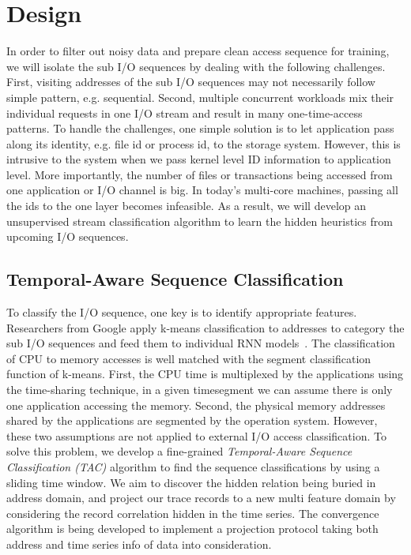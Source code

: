 \section{Design}

In order to filter out noisy data and prepare clean access sequence for training,
we will isolate the sub I/O sequences by dealing with the following challenges.
First, visiting addresses of the sub I/O sequences may not necessarily follow simple pattern, e.g. sequential.
Second, multiple concurrent workloads mix their individual requests in one I/O stream and result in many one-time-access patterns.
To handle the challenges, one simple solution is to let application pass along its identity,
e.g. file id or process id, to the storage system.
However, this is intrusive to the system when we pass kernel level ID information to application level.
More importantly, the number of files or transactions being accessed from one application or I/O channel is big.
In today's multi-core machines, passing all the ids to the one layer becomes infeasible.
As a result, we will develop an unsupervised stream classification algorithm to learn the hidden heuristics from upcoming I/O sequences.

\subsection{Temporal-Aware Sequence Classification}

To classify the I/O sequence,
one key is to identify appropriate features.
Researchers from Google apply k-means classification to addresses
to category the sub I/O sequences and feed them
to individual RNN models~\cite{hashemi2018learning, peled2018towards}.
The classification of CPU to memory accesses is well matched with
the segment classification function of k-means.
First, the CPU time is multiplexed by the applications using the time-sharing technique,
in a given timesegment we can assume there is only one application accessing the memory.
Second, the physical memory addresses shared by the applications are segmented by the operation system.
However, these two assumptions are not applied to external I/O access classification.
To solve this problem, we develop a fine-grained \emph{Temporal-Aware Sequence Classification (TAC)} algorithm
to find the sequence classifications by using a sliding time window.
We aim to discover the hidden relation being buried in address domain,
and project our trace records to a new multi feature domain
by considering the record correlation hidden in the time series.
The convergence algorithm is being developed to implement a projection protocol
taking both address and time series info of data into consideration.

